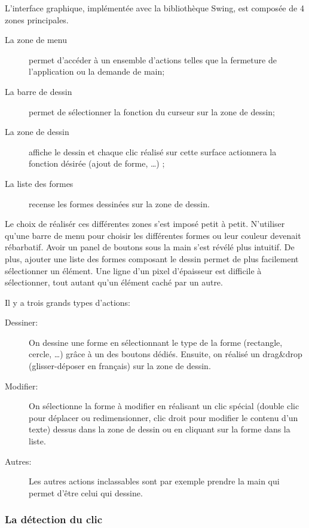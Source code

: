 \documentclass[a4paper,11pt]{article}
\begin{document}
L'interface graphique, impl\'ement\'ee avec la bibliothèque Swing, est compos\'ee de 4 zones principales.

\begin{description}
 \item[La zone de menu] permet d'acc\'eder \`a un ensemble d'actions telles que la fermeture de l'application ou la demande de main;
 \item[La barre de dessin] permet de s\'electionner la fonction du curseur sur la zone de dessin;
 \item[La zone de dessin] affiche le dessin et chaque clic r\'ealis\'e sur cette surface actionnera la fonction d\'esir\'ee (ajout de forme, \ldots) ;
 \item[La liste des formes] recense les formes dessin\'ees sur la zone de dessin.
\end{description}

Le choix de r\'ealis\'er ces diff\'erentes zones s'est impos\'e petit \`a petit. N'utiliser qu'une barre de menu pour choisir les diff\'erentes formes ou leur couleur devenait r\'ebarbatif. Avoir un panel de boutons sous la main s'est r\'ev\'el\'e plus intuitif. De plus, ajouter une liste des formes composant le dessin permet de plus facilement s\'electionner un \'el\'ement. Une ligne d'un pixel d'\'epaisseur est difficile \`a s\'electionner, tout autant qu'un \'el\'ement cach\'e par un autre. 

Il y a trois grands types d'actions: 

\begin{description}
 \item[Dessiner:] On dessine une forme en s\'electionnant le type de la forme (rectangle, cercle, \ldots) gr\^ace \`a un des boutons d\'edi\'es. Ensuite, on r\'ealis\'e un \og drag\&drop \fg (\og glisser-d\'eposer \fg en fran\c{c}ais) sur la zone de dessin.
 
 \item[Modifier:] On s\'electionne la forme \`a modifier en r\'ealisant un clic sp\'ecial (double clic pour d\'eplacer ou redimensionner, clic droit pour modifier le contenu d'un texte) dessus dans la zone de dessin ou en cliquant sur la forme dans la liste. 
 
 \item[Autres:] Les autres actions inclassables sont par exemple \og prendre la main \fg qui permet d'\^etre celui qui dessine.
\end{description}

\subsubsection{La d\'etection du clic}
\end{document}
